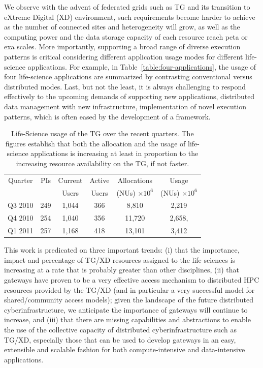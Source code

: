\documentclass{sig-alternate}
\begin{document}

We observe with the advent of federated grids such as TG and its
transition to eXtreme Digital (XD) environment, such requirements
become harder to achieve as the number of connected sites and
heterogeneity will grow, as well as the computing power and the data
storage capacity of each resource reach peta or exa scales.  More
importantly, supporting a broad range of diverse execution patterns is
critical considering different application usage modes for different
life-science applications.  For example, in
Table~\ref{table:four-applications}, the usage of four life-science
applications are summarized by contrasting conventional versus
distributed modes.  Last, but not the least, it is always challenging
to respond effectively to the upcoming demands of supporting new
applications, distributed data management with new infrastructure,
implementation of novel execution patterns, which is often eased by
the development of a framework.


\begin{table}
 \small
\begin{tabular}{|c|c|c|c|c|c|} 
  \hline  Quarter & PIs & Current & Active & Allocations  & Usage\\
  & & Users  &  Users & (NUs) $\times 10^6$& (NUs) $\times 10^6$ \\ \hline
  Q3 2010 & 249 & 1,044 & 366 & 8,810   & 2,219  \\ \hline
  Q4 2010 & 254 & 1,040 & 356 & 11,720  & 2,658, \\ \hline
  Q1 2011 & 257 & 1,168 & 418 & 13,101  & 3,412\\ \hline 
\end{tabular} 
\caption{Life-Science usage of the TG over the recent
  quarters. The figures establish that both the  allocation and the
  usage of life-science applications is increasing at least in
  proportion to the increasing resource availability on the TG,
  if not faster.}
 \label{tg2011} 
\end{table}

This work is predicated on three important trends: (i) that the
importance, impact and percentage of TG/XD resources assigned to
the life sciences is increasing at a rate that is probably greater
than other disciplines, (ii) that gateways have proven to be a very
effective access mechanism to distributed HPC resources provided by
the TG/XD (and in particular a very successful model for
shared/community access models); given the landscape of the future
distributed cyberinfrastructure, we anticipate the importance of
gateways will continue to increase, and (iii) that there are missing
capabilities and abstractions to enable the use of the collective
capacity of distributed cyberinfrastructure such as TG/XD, especially
those that can be used to develop gateways in an easy, extensible and
scalable fashion for both compute-intensive and data-intensive
applications.
\end{document}
